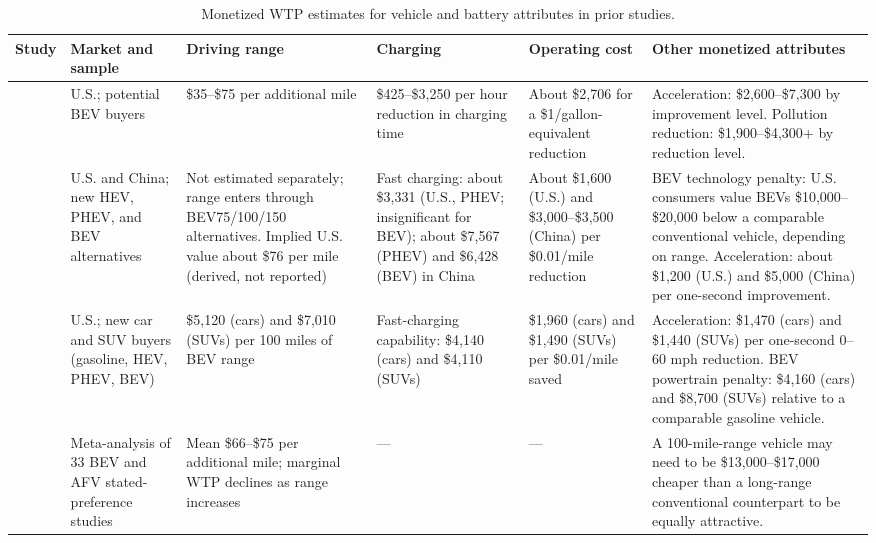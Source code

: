 \begin{landscape}
\begin{table}[pos=H]
\selectfont
\centering
\caption{Monetized WTP estimates for vehicle and battery attributes in prior studies.}
\label{table:wtp_lit_summary}
\footnotesize
\begin{adjustbox}{width=1.3\textwidth, center}
{\renewcommand{\arraystretch}{1.35}
\begin{tabular}{>{\raggedright\arraybackslash}p{2.6cm} >{\raggedright\arraybackslash}p{3.4cm} >{\raggedright\arraybackslash}p{4.2cm} >{\raggedright\arraybackslash}p{4.2cm} >{\raggedright\arraybackslash}p{3.8cm} >{\raggedright\arraybackslash}p{5.2cm}}
\toprule
\textbf{Study} & \textbf{Market and sample} & \textbf{Driving range} & \textbf{Charging} & \textbf{Operating cost} & \textbf{Other monetized attributes} \\
\midrule
\textcite{hidrueWillingnessPayElectric2011} & U.S.; potential BEV buyers & \$35--\$75 per additional mile & \$425--\$3,250 per hour reduction in charging time & About \$2,706 for a \$1/gallon-equivalent reduction & Acceleration: \$2,600--\$7,300 by improvement level. Pollution reduction: \$1,900--\$4,300+ by reduction level. \\
\addlinespace[3pt]
\textcite{helvestonWillSubsidiesDrive2015} & U.S. and China; new HEV, PHEV, and BEV alternatives & Not estimated separately; range enters through BEV75/100/150 alternatives. Implied U.S. value about \$76 per mile (derived, not reported) & Fast charging: about \$3,331 (U.S., PHEV; insignificant for BEV); about \$7,567 (PHEV) and \$6,428 (BEV) in China & About \$1,600 (U.S.) and \$3,000--\$3,500 (China) per \$0.01/mile reduction & BEV technology penalty: U.S. consumers value BEVs \$10,000--\$20,000 below a comparable conventional vehicle, depending on range. Acceleration: about \$1,200 (U.S.) and \$5,000 (China) per one-second improvement. \\
\addlinespace[3pt]
\textcite{forsytheTechnologyAdvancementDriving2023} & U.S.; new car and SUV buyers (gasoline, HEV, PHEV, BEV) & \$5,120 (cars) and \$7,010 (SUVs) per 100 miles of BEV range & Fast-charging capability: \$4,140 (cars) and \$4,110 (SUVs) & \$1,960 (cars) and \$1,490 (SUVs) per \$0.01/mile saved & Acceleration: \$1,470 (cars) and \$1,440 (SUVs) per one-second 0--60 mph reduction. BEV powertrain penalty: \$4,160 (cars) and \$8,700 (SUVs) relative to a comparable gasoline vehicle. \\
\addlinespace[3pt]
\textcite{dimitropoulosConsumerValuationChanges2013} & Meta-analysis of 33 BEV and AFV stated-preference studies & Mean \$66--\$75 per additional mile; marginal WTP declines as range increases & --- & --- & A 100-mile-range vehicle may need to be \$13,000--\$17,000 cheaper than a long-range conventional counterpart to be equally attractive. \\

\end{tabular}}
\end{adjustbox}
\end{table}
\end{landscape}
